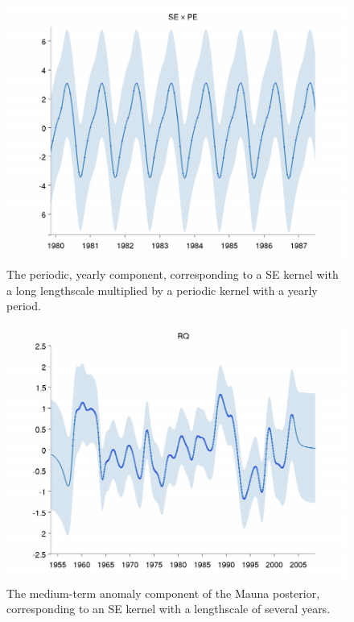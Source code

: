 \documentclass[twoside]{article}
\begin{document}
\begin{figure}
\includegraphics[width=\columnwidth]{../figures/decomposition/mauna_test_2}
\caption{The periodic, yearly component, corresponding to a SE kernel with a long lengthscale multiplied by a periodic kernel with a yearly period.}
\label{fig:mauna_decomp2}
\end{figure}

\begin{figure}
\includegraphics[width=\columnwidth]{../figures/decomposition/mauna_test_3}
\caption{The medium-term anomaly component of the Mauna posterior, corresponding to an SE kernel with a lengthscale of several years.}
\label{fig:mauna_decomp3}
\end{figure}
\end{document}
